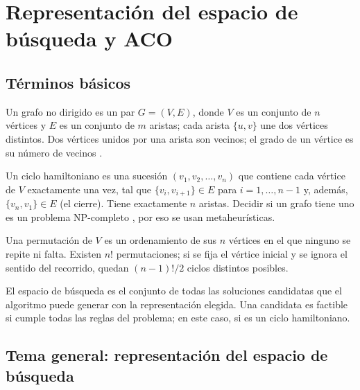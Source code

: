 \chapter{Representación del espacio de búsqueda y ACO}
\section{Términos básicos}

\begin{definicion}[Grafo]
Un grafo no dirigido es un par $G=(V,E)$, donde $V$ es un conjunto de $n$ vértices
y $E$ es un conjunto de $m$ aristas; cada arista $\{u,v\}$ une dos vértices distintos.
Dos vértices unidos por una arista son vecinos; el grado de un vértice es su
número de vecinos \cite{aco6}.
\end{definicion}

\begin{definicion}
Un ciclo hamiltoniano es una sucesión $(v_1,v_2,\dots,v_n)$ que contiene cada vértice de $V$
exactamente una vez, tal que $\{v_i,v_{i+1}\}\in E$ para $i=1,\dots,n-1$ y, además,
$\{v_n,v_1\}\in E$ (el cierre). Tiene exactamente $n$ aristas. Decidir si un grafo
tiene uno es un problema NP-completo \cite{aco7}, por eso se usan metaheurísticas.
\end{definicion}

\begin{definicion}[Permutación]
Una permutación de $V$ es un ordenamiento de sus $n$ vértices en el que ninguno se repite
ni falta. Existen $n!$ permutaciones; si se fija el vértice inicial y se ignora el sentido
del recorrido, quedan $(n-1)!/2$ ciclos distintos posibles.
\end{definicion}

\begin{definicion}
El espacio de búsqueda es el conjunto de todas las soluciones candidatas que el
algoritmo puede generar con la representación elegida. Una candidata es factible
si cumple todas las reglas del problema; en este caso, si es un ciclo hamiltoniano.
\end{definicion}

\section{Tema general: representación del espacio de búsqueda}

